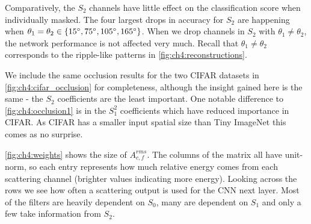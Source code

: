 Comparatively, the $S_2$ channels have little effect on the classification score
when individually masked. The four largest drops in accuracy for
$S_2$ are happening when $\theta_1 = \theta_2 \in \{15^{\circ}, 75^{\circ}, 105^{\circ}, 165^{\circ}\}$.
When we drop channels in $S_2$ with $\theta_1 \neq \theta_2$, the network performance is not affected
very much. Recall that $\theta_1 \neq \theta_2$ corresponds to the ripple-like patterns in
\autoref{fig:ch4:reconstructions}.

We include the same occlusion results for the two CIFAR datasets in
\autoref{fig:ch4:cifar_occlusion} for completeness, although the insight gained
here is the same - the $S_2$ coefficients are the least important. One notable difference to
\autoref{fig:ch4:occlusion1} is in the $S_1^2$ coefficients which have reduced importance 
in CIFAR\@. As CIFAR has a smaller input spatial size than Tiny ImageNet this comes as no surprise.

\autoref{fig:ch4:weights} shows the size of $A^{rms}_{c,f}$. The columns of the matrix all have
unit-norm, so each entry represents how much relative energy comes from each
scattering channel (brighter values indicating more energy). Looking across the rows we see how often a scattering output
is used for the CNN next layer. Most of the filters are heavily dependent on 
$S_0$, many are dependent on $S_1$ and only a few take information from $S_2$.


